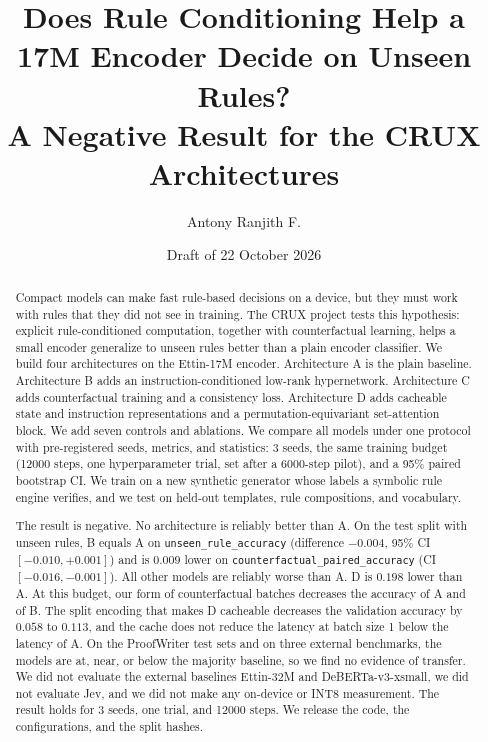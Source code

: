 \documentclass[11pt,a4paper]{article}
\title{Does Rule Conditioning Help a 17M Encoder Decide on Unseen Rules?\\
A Negative Result for the CRUX Architectures}
\author{Antony Ranjith F.}
\date{Draft of 22 October 2026}
\newcommand{\ura}{\texttt{unseen\_\allowbreak rule\_\allowbreak accuracy}}
\newcommand{\cpa}{\texttt{counterfactual\_\allowbreak paired\_\allowbreak accuracy}}
\begin{document}
\maketitle

\begin{abstract}
\noindent
Compact models can make fast rule-based decisions on a device, but they must work with rules that they did not see in training.
The CRUX project tests this hypothesis: explicit rule-conditioned computation, together with counterfactual learning, helps a small encoder generalize to unseen rules better than a plain encoder classifier.
We build four architectures on the Ettin-17M encoder.
Architecture A is the plain baseline.
Architecture B adds an instruction-conditioned low-rank hypernetwork.
Architecture C adds counterfactual training and a consistency loss.
Architecture D adds cacheable state and instruction representations and a permutation-equivariant set-attention block.
We add seven controls and ablations.
We compare all models under one protocol with pre-registered seeds, metrics, and statistics: 3 seeds, the same training budget (12000 steps, one hyperparameter trial, set after a 6000-step pilot), and a 95\% paired bootstrap CI.
We train on a new synthetic generator whose labels a symbolic rule engine verifies, and we test on held-out templates, rule compositions, and vocabulary.

The result is negative.
No architecture is reliably better than A.
On the test split with unseen rules, B equals A on \ura{} (difference $-0.004$, 95\% CI $[-0.010, +0.001]$) and is $0.009$ lower on \cpa{} (CI $[-0.016, -0.001]$).
All other models are reliably worse than A.
D is $0.198$ lower than A.
At this budget, our form of counterfactual batches decreases the accuracy of A and of B.
The split encoding that makes D cacheable decreases the validation accuracy by $0.058$ to $0.113$, and the cache does not reduce the latency at batch size 1 below the latency of A.
On the ProofWriter test sets and on three external benchmarks, the models are at, near, or below the majority baseline, so we find no evidence of transfer.
We did not evaluate the external baselines Ettin-32M and DeBERTa-v3-xsmall, we did not evaluate Jev, and we did not make any on-device or INT8 measurement.
The result holds for 3 seeds, one trial, and 12000 steps.
We release the code, the configurations, and the split hashes.
\end{abstract}

\end{document}
